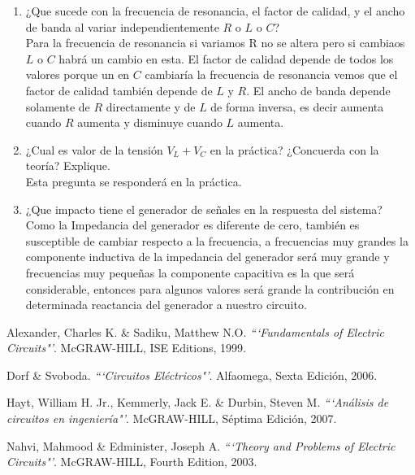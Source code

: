 \documentclass[twocolumn]{IEEEtran}
\begin{document}
\begin{enumerate}
 \item ¿Que sucede con la frecuencia de resonancia, el factor de calidad, y el ancho de banda
al variar independientemente $R$ o $L$ o $C$?\\
Para la frecuencia de resonancia si variamos R no se altera pero si cambiaos $L$ o $C$ habrá un cambio en esta. El factor de calidad depende de todos los valores porque un en $C$ cambiaría la frecuencia de resonancia vemos que el factor de calidad también depende de $L$ y $R$. El ancho de banda depende solamente de $R$ directamente y de $L$ de forma inversa, es decir aumenta cuando $R$ aumenta y disminuye cuando $L$ aumenta.

 \item ¿Cual es valor de la tensión $V_L + V_C$ en la práctica? ¿Concuerda con la teoría? Explique.\\
Esta pregunta se responderá en la práctica.

 \item ¿Que impacto tiene el generador de señales en la respuesta del sistema?\\
Como la Impedancia del generador es diferente de cero, también es susceptible de cambiar respecto a la frecuencia, a frecuencias muy grandes la componente inductiva  de la impedancia del generador será muy grande y frecuencias muy pequeñas la componente capacitiva es la que será considerable, entonces para algunos valores será grande la contribución en  determinada reactancia del generador a nuestro circuito.
\end{enumerate}


\begin{thebibliography}{99}
 Alexander, Charles K. \&  Sadiku, Matthew N.O.
{\em ```Fundamentals of Electric Circuits"'}.
McGRAW-HILL, ISE Editions, 1999.

 Dorf  \& Svoboda.
{\em ```Circuitos Eléctricos"'}.
Alfaomega, Sexta Edición, 2006.

 Hayt, William H. Jr., Kemmerly, Jack E. \& Durbin, Steven M.
{\em ```Análisis de circuitos en ingeniería"'}.
McGRAW-HILL, Séptima Edición, 2007.

 Nahvi, Mahmood \& Edminister, Joseph A.
{\em ```Theory and Problems of Electric Circuits"'}.
McGRAW-HILL, Fourth Edition, 2003.

\end{thebibliography}
\end{document}

